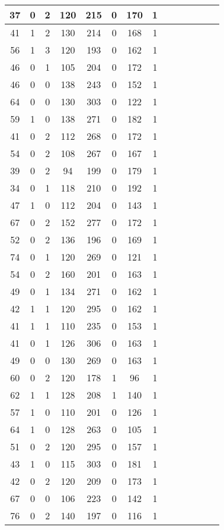 \documentclass{article}
\begin{document}
\begin{center}
\begin{longtable}{|c|c|c|c|c|c|c|c|c|c|c|c|c|c|}
\hline
37 & 0 & 2 & 120 & 215 & 0 & 170 & 1 \\
\hline
41 & 1 & 2 & 130 & 214 & 0 & 168 & 1 \\
\hline
56 & 1 & 3 & 120 & 193 & 0 & 162 & 1 \\
\hline
46 & 0 & 1 & 105 & 204 & 0 & 172 & 1 \\
\hline
46 & 0 & 0 & 138 & 243 & 0 & 152 & 1 \\
\hline
64 & 0 & 0 & 130 & 303 & 0 & 122 & 1 \\
\hline
59 & 1 & 0 & 138 & 271 & 0 & 182 & 1 \\
\hline
41 & 0 & 2 & 112 & 268 & 0 & 172 & 1 \\
\hline
54 & 0 & 2 & 108 & 267 & 0 & 167 & 1 \\
\hline
39 & 0 & 2 & 94 & 199 & 0 & 179 & 1 \\
\hline
34 & 0 & 1 & 118 & 210 & 0 & 192 & 1 \\
\hline
47 & 1 & 0 & 112 & 204 & 0 & 143 & 1 \\
\hline
67 & 0 & 2 & 152 & 277 & 0 & 172 & 1 \\
\hline
52 & 0 & 2 & 136 & 196 & 0 & 169 & 1 \\
\hline
74 & 0 & 1 & 120 & 269 & 0 & 121 & 1 \\
\hline
54 & 0 & 2 & 160 & 201 & 0 & 163 & 1 \\
\hline
49 & 0 & 1 & 134 & 271 & 0 & 162 & 1 \\
\hline
42 & 1 & 1 & 120 & 295 & 0 & 162 & 1 \\
\hline
41 & 1 & 1 & 110 & 235 & 0 & 153 & 1 \\
\hline
41 & 0 & 1 & 126 & 306 & 0 & 163 & 1 \\
\hline
49 & 0 & 0 & 130 & 269 & 0 & 163 & 1 \\
\hline
60 & 0 & 2 & 120 & 178 & 1 & 96 & 1 \\
\hline
62 & 1 & 1 & 128 & 208 & 1 & 140 & 1 \\
\hline
57 & 1 & 0 & 110 & 201 & 0 & 126 & 1 \\
\hline
64 & 1 & 0 & 128 & 263 & 0 & 105 & 1 \\
\hline
51 & 0 & 2 & 120 & 295 & 0 & 157 & 1 \\
\hline
43 & 1 & 0 & 115 & 303 & 0 & 181 & 1 \\
\hline
42 & 0 & 2 & 120 & 209 & 0 & 173 & 1 \\
\hline
67 & 0 & 0 & 106 & 223 & 0 & 142 & 1 \\
\hline
76 & 0 & 2 & 140 & 197 & 0 & 116 & 1 \\

\end{longtable}
\end{center}
\end{document}
